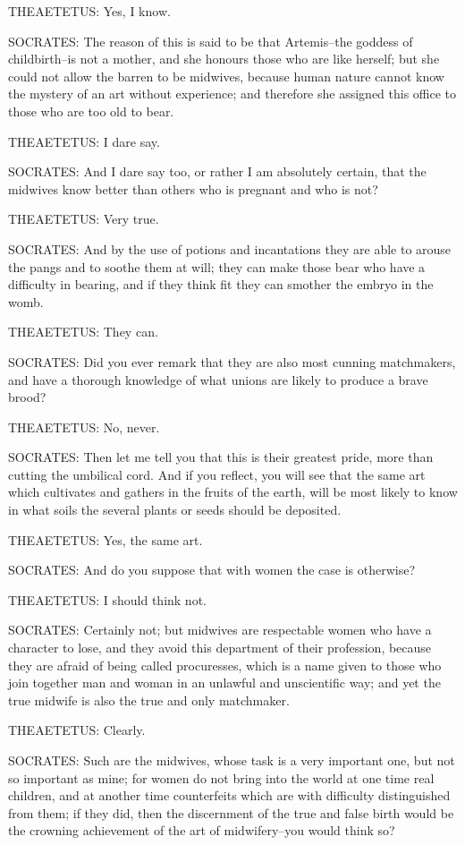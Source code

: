 THEAETETUS: Yes, I know.

SOCRATES: The reason of this is said to be that Artemis--the goddess of
childbirth--is not a mother, and she honours those who are like herself;
but she could not allow the barren to be midwives, because human nature
cannot know the mystery of an art without experience; and therefore she
assigned this office to those who are too old to bear.

THEAETETUS: I dare say.

SOCRATES: And I dare say too, or rather I am absolutely certain, that
the midwives know better than others who is pregnant and who is not?

THEAETETUS: Very true.

SOCRATES: And by the use of potions and incantations they are able to
arouse the pangs and to soothe them at will; they can make those bear
who have a difficulty in bearing, and if they think fit they can smother
the embryo in the womb.

THEAETETUS: They can.

SOCRATES: Did you ever remark that they are also most cunning
matchmakers, and have a thorough knowledge of what unions are likely to
produce a brave brood?

THEAETETUS: No, never.

SOCRATES: Then let me tell you that this is their greatest pride, more
than cutting the umbilical cord. And if you reflect, you will see that
the same art which cultivates and gathers in the fruits of the earth,
will be most likely to know in what soils the several plants or seeds
should be deposited.

THEAETETUS: Yes, the same art.

SOCRATES: And do you suppose that with women the case is otherwise?

THEAETETUS: I should think not.

SOCRATES: Certainly not; but midwives are respectable women who have a
character to lose, and they avoid this department of their profession,
because they are afraid of being called procuresses, which is a name
given to those who join together man and woman in an unlawful and
unscientific way; and yet the true midwife is also the true and only
matchmaker.

THEAETETUS: Clearly.

SOCRATES: Such are the midwives, whose task is a very important one, but
not so important as mine; for women do not bring into the world at one
time real children, and at another time counterfeits which are with
difficulty distinguished from them; if they did, then the discernment of
the true and false birth would be the crowning achievement of the art of
midwifery--you would think so?

